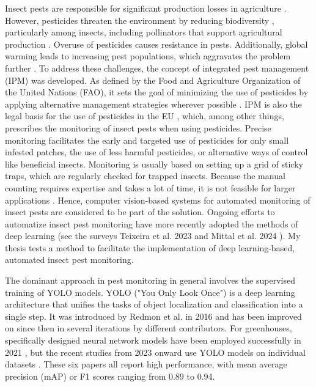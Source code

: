 \documentclass[12pt, a4paper]{article}
\begin{document}
Insect pests are responsible for significant production losses in agriculture \cite{climate}. However, pesticides threaten the environment by reducing biodiversity \cite{Wan2025}, particularly among insects, including pollinators that support agricultural production \cite{Smith2022PollinatorDeficits}. Overuse of pesticides causes resistance in pests. Additionally, global warming leads to increasing pest populations, which aggravates the problem further \cite{climate}. To address these challenges, the concept of integrated pest management (IPM) was developed. As defined by the Food and Agriculture Organization of the United Nations (FAO), it sets the goal of minimizing the use of pesticides by applying alternative management strategies wherever possible \cite{IPM_FAO, IPM_book}. %
IPM is also the legal basis for the use of pesticides in the EU \cite{IPM_EU}, which, among other things, prescribes the monitoring of insect pests when using pesticides. Precise monitoring facilitates the early and targeted use of pesticides for only small infested patches, the use of less harmful pesticides, or alternative ways of control like beneficial insects. Monitoring is usually based on setting up a grid of sticky traps, which are regularly checked for trapped insects. Because the manual counting requires expertise and takes a lot of time, it is not feasible for larger applications \cite{survey2022}. Hence, computer vision-based systems for automated monitoring of insect pests are considered to be part of the solution. Ongoing efforts to automatize insect pest monitoring have more recently adopted the methods of deep learning (see the surveys Teixeira et al. 2023 \cite{survey2023} and Mittal et al. 2024 \cite{survey2024b}). My thesis tests a method to facilitate the implementation of deep learning-based, automated insect pest monitoring.

The dominant approach in pest monitoring in general involves the supervised training of YOLO models. YOLO ("You Only Look Once") is a deep learning architecture that unifies the tasks of object localization and classification into a single step. It was introduced by Redmon et al. in 2016 \cite{redmon2016you} and has been improved on since then in several iterations by different contributors. For greenhouses, specifically designed neural network models have been employed successfully in 2021 \cite{rustia_automatic_2021, li_field_2021}, but the recent studies from 2023 onward use YOLO models on individual datasets \cite{costa_intelligent_2023, zhang_automatic_2023, wang_deep-learning-based_2024, shi_small_2025}. These six papers all report high performance, with mean average precision (mAP) or F1 scores ranging from 0.89 to 0.94.
\end{document}
